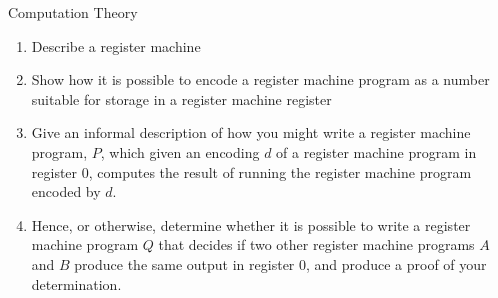\documentclass{tripos}  %
\begin{document}
\begin{question}[MockIB,year=2024,paper=1,question=10,author=rrw]{Computation Theory}


\begin{enumerate}
\item Describe a register machine 
\item Show how it is possible to encode a register machine program as a number suitable for storage in a register machine register 
\item Give an informal description of how you might write a register machine program, $P$, which given an encoding $d$ of a register machine program in register 0, computes the result of running the register machine program encoded by $d$. 
\item Hence, or otherwise, determine whether it is possible to write a register machine program $Q$ that decides if two other register machine programs $A$ and $B$ produce the same output in register 0, and produce a proof of your determination. 
\end{enumerate}

\end{question}
\end{document}

